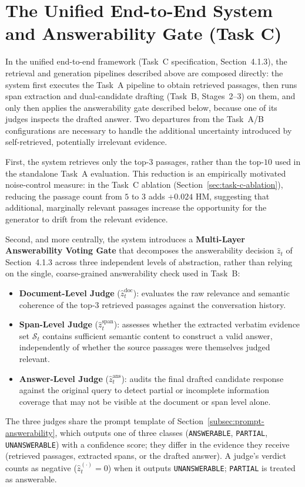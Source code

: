 \section{The Unified End-to-End System and Answerability Gate (Task C)}
\label{sec:e2e-system}

In the unified end-to-end framework (Task~C specification, Section~4.1.3), the retrieval and generation pipelines described above are composed directly: the system first executes the Task~A pipeline to obtain retrieved passages, then runs span extraction and dual-candidate drafting (Task~B, Stages~2--3) on them, and only then applies the answerability gate described below, because one of its judges inspects the drafted answer. Two departures from the Task~A/B configurations are necessary to handle the additional uncertainty introduced by self-retrieved, potentially irrelevant evidence.

First, the system retrieves only the top-$3$ passages, rather than the top-$10$ used in the standalone Task~A evaluation. This reduction is an empirically motivated noise-control measure: in the Task~C ablation (Section~\ref{sec:task-c-ablation}), reducing the passage count from $5$ to $3$ adds $+0.024$ HM, suggesting that additional, marginally relevant passages increase the opportunity for the generator to drift from the relevant evidence.

Second, and more centrally, the system introduces a \textbf{Multi-Layer Answerability Voting Gate} that decomposes the answerability decision $\hat{z}_t$ of Section~4.1.3 across three independent levels of abstraction, rather than relying on the single, coarse-grained answerability check used in Task~B:

\begin{itemize}
    \item \textbf{Document-Level Judge} ($\hat{z}_t^{\text{doc}}$): evaluates the raw relevance and semantic coherence of the top-3 retrieved passages against the conversation history.
    \item \textbf{Span-Level Judge} ($\hat{z}_t^{\text{span}}$): assesses whether the extracted verbatim evidence set $\mathcal{S}_t$ contains sufficient semantic content to construct a valid answer, independently of whether the source passages were themselves judged relevant.
    \item \textbf{Answer-Level Judge} ($\hat{z}_t^{\text{ans}}$): audits the final drafted candidate response against the original query to detect partial or incomplete information coverage that may not be visible at the document or span level alone.
\end{itemize}
The three judges share the prompt template of Section~\ref{subsec:prompt-answerability}, which outputs one of three classes (\texttt{ANSWERABLE}, \texttt{PARTIAL}, \texttt{UNANSWERABLE}) with a confidence score; they differ in the evidence they receive (retrieved passages, extracted spans, or the drafted answer). A judge's verdict counts as negative ($\hat{z}_t^{(\cdot)} = 0$) when it outputs \texttt{UNANSWERABLE}; \texttt{PARTIAL} is treated as answerable.

